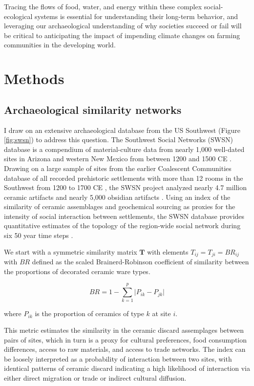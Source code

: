 \documentclass[fleqn,10pt]{wlscirep}
\begin{document}
Tracing the flows of food, water, and energy within these complex social-ecological systems is essential for understanding their long-term behavior, and leveraging our archaeological understanding of why societies succeed or fail will be critical to anticipating the impact of impending climate changes on farming communities in the developing world.

\section*{Methods}

\subsection*{Archaeological similarity networks}

I draw on an extensive archaeological database from the US Southwest (Figure \ref{fig:swsn}) to address this question. The Southwest Social Networks (SWSN) database is a compendium of material-culture data from nearly 1,000 well-dated sites in Arizona and western New Mexico from between 1200 and 1500 CE \cite{Mills2012,Mills2013a,Peeples2013,Borck2015,Hill2015,Mills2015a}. Drawing on a large sample of sites from the earlier Coalescent Communities database of all recorded prehistoric settlements with more than 12 rooms in the Southwest from 1200 to 1700 CE \cite{Hill2004}, the SWSN project analyzed nearly 4.7 million ceramic artifacts and nearly 5,000 obsidian artifacts \cite{Mills2015a}. Using an index of the similarity of ceramic assemblages and geochemical sourcing as proxies for the intensity of social interaction between settlements, the SWSN database provides quantitative estimates of the topology of the region-wide social network during six 50 year time steps \cite{Mills2013a}.


We start with a symmetric similarity matrix $\mathbf{T}$ with elements $T_{ij} = T_{ji} = BR_{ij}$ with $BR$ defined as the scaled Brainerd-Robinson coefficient of similarity between the proportions of decorated ceramic ware types.

$$BR = 1 - \sum_{k=1}^{p} \lvert P_{ik} - P_{jk} \rvert$$

where $P_{ik}$ is the proportion of ceramics of type $k$ at site $i$.

This metric estimates the similarity in the ceramic discard assemplages between pairs of sites, which in turn is a proxy for cultural preferences, food consumption differences, access to raw materials, and access to trade networks. The index can be loosely interpreted as a probability of interaction between two sites, with identical patterns of ceramic discard indicating a high likelihood of interaction via either direct migration or trade or indirect cultural diffusion.
\end{document}
